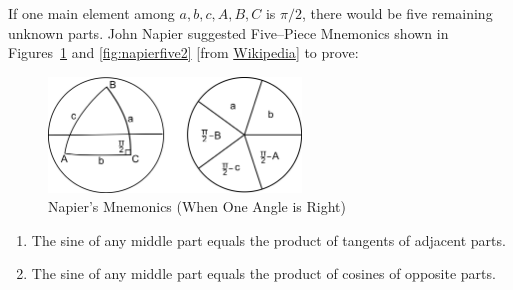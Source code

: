 \begin{tcolorbox}[title={Napier's Rules}]
    \begin{question}[name={Napier's Rules for Right Spherical Triangles}]
        If one main element among $a,b,c,A,B,C$ is $\pi/2$, there would be five remaining unknown parts. John Napier suggested Five--Piece Mnemonics shown in Figures~\ref{fig:napierfive1} and \ref{fig:napierfive2} [from \href{https://en.wikipedia.org/wiki/File:Spherical_trigonometry_Napier_right-angled.svg}{Wikipedia}] to prove:
        \begin{figure}[H]
            \centering
            \includegraphics[width=0.6\textwidth]{IMG/Napier.png}
            \caption{Napier's Mnemonics (When One Angle is Right)}
            \label{fig:napierfive1}
        \end{figure}
        \begin{enumerate}
            \item The sine of any middle part equals the product of tangents of adjacent parts.
            \item The sine of any middle part equals the product of cosines of opposite parts.
        \end{enumerate}
    \end{question}
\end{tcolorbox}


